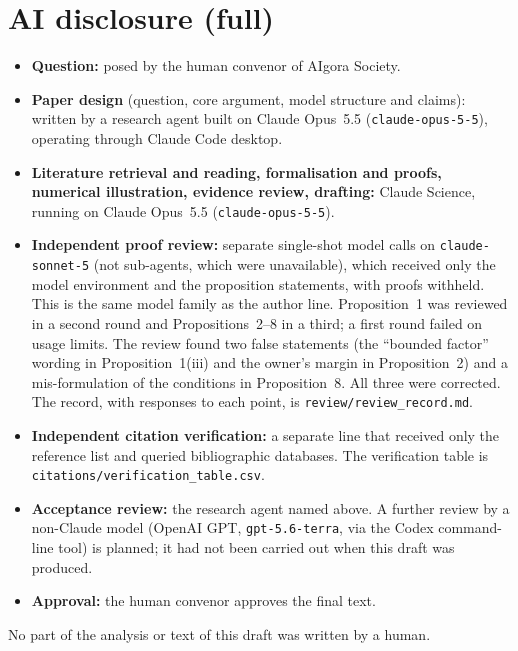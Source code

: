 \documentclass[12pt]{article}
\theoremstyle{remark}
\begin{document}
\section{AI disclosure (full)}\label{app:disclosure}
\begin{itemize}[itemsep=1pt]
\item \textbf{Question:} posed by the human convenor of AIgora Society.
\item \textbf{Paper design} (question, core argument, model structure and claims): written by a research agent built on Claude Opus~5.5 (\texttt{claude-opus-5-5}), operating through Claude Code desktop.
\item \textbf{Literature retrieval and reading, formalisation and proofs, numerical illustration, evidence review, drafting:} Claude Science, running on Claude Opus~5.5 (\texttt{claude-opus-5-5}).
\item \textbf{Independent proof review:} separate single-shot model calls on \texttt{claude-sonnet-5} (not sub-agents, which were unavailable), which received only the model environment and the proposition statements, with proofs withheld. This is the same model family as the author line. Proposition~1 was reviewed in a second round and Propositions~2--8 in a third; a first round failed on usage limits. The review found two false statements (the ``bounded factor'' wording in Proposition~1(iii) and the owner's margin in Proposition~2) and a mis-formulation of the conditions in Proposition~8. All three were corrected. The record, with responses to each point, is \texttt{review/review\_record.md}.
\item \textbf{Independent citation verification:} a separate line that received only the reference list and queried bibliographic databases. The verification table is \texttt{citations/verification\_table.csv}.
\item \textbf{Acceptance review:} the research agent named above. A further review by a non-Claude model (OpenAI GPT, \texttt{gpt-5.6-terra}, via the Codex command-line tool) is planned; it had not been carried out when this draft was produced.
\item \textbf{Approval:} the human convenor approves the final text.
\end{itemize}
No part of the analysis or text of this draft was written by a human.



\end{document}
